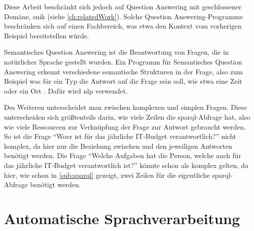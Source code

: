 Diese Arbeit beschränkt sich jedoch auf Question Answering mit geschlossener Domäne, \ac{snik} (siehe \cref{ch:relatedWork}).
Solche Question Answering-Programme beschränken sich auf einen Fachbereich,
was etwa den Kontext vom vorherigen Beispiel bereitstellen würde.

\begin{definition}
Semantisches Question Answering ist die Beantwortung von Fragen, die in natürlicher Sprache gestellt wurden.
Ein Programm für Semantisches Question Answering erkennt verschiedene semantische Strukturen in der Frage,
also zum Beispiel was für ein Typ die Antwort auf die Frage sein soll, wie etwa eine Zeit oder ein Ort \citep{sqadefinition}.
Dafür wird \acs{nlp} verwendet.
\end{definition}

Des Weiteren unterscheidet man zwischen komplexen und simplen Fragen.
Diese unterscheiden sich größtenteils darin, wie viele Zeilen die \ac{sparql}-Abfrage hat, also wie viele Ressourcen zur Verknüpfung der Frage zur Antwort gebraucht werden.
So ist die Frage \enquote{Woer ist für das jährliche IT-Budget verantwortlich?} nicht komplex,
da hier nur die Beziehung zwischen  und den jeweiligen Antworten benötigt werden.
Die Frage \enquote{Welche Aufgaben hat die Person, welche auch für das jährliche IT-Budget verantwortlich ist?} könnte schon als komplex gelten, da hier, wie schon in \cref{sub:sparql} gezeigt,
zwei Zeilen für die eigentliche \ac{sparql}-Abfrage benötigt werden.

\section{Automatische Sprachverarbeitung}

